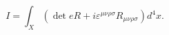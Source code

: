 \begin{equation}
I=\int_X (\det e R+i\varepsilon^{\mu\nu\rho\sigma}R_{\mu\nu\rho\sigma})d^4x.\label{accion1}
\end{equation}

